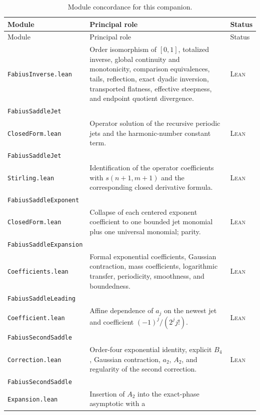 \documentclass[11pt,oneside]{article}
\theoremstyle{definition}
\theoremstyle{remark}
\newcommand{\Formalized}{\textsc{Lean}}
\begin{document}
\begingroup
\small
\begin{longtable}{>{\raggedright\arraybackslash}p{}
                  >{\raggedright\arraybackslash}p{}
                  >{\raggedright\arraybackslash}p{}}
\caption{Module concordance for this companion.}
\label{tab:module-concordance}\\
\toprule
Module & Principal role & Status\\
\midrule
\endfirsthead
\toprule
Module & Principal role & Status\\
\midrule
\endhead
\texttt{FabiusInverse.lean} &
Order isomorphism of $[0,1]$, totalized inverse, global continuity and
monotonicity, comparison equivalences, tails, reflection, exact dyadic
inversion, transported flatness, effective steepness, and endpoint
quotient divergence. & \Formalized\\
\texttt{FabiusSaddleJet}\\\texttt{ClosedForm.lean} &
Operator solution of the recursive periodic jets and the harmonic-number
constant term. & \Formalized\\
\texttt{FabiusSaddleJet}\\\texttt{Stirling.lean} &
Identification of the operator coefficients with
$s(n+1,m+1)$ and the corresponding closed derivative formula. &
\Formalized\\
\texttt{FabiusSaddleExponent}\\\texttt{ClosedForm.lean} &
Collapse of each centered exponent coefficient to one bounded jet
monomial plus one universal monomial; parity. & \Formalized\\
\texttt{FabiusSaddleExpansion}\\\texttt{Coefficients.lean} &
Formal exponential coefficients, Gaussian contraction, mass
coefficients, logarithmic transfer, periodicity, smoothness, and
boundedness. & \Formalized\\
\texttt{FabiusSaddleLeading}\\\texttt{Coefficient.lean} &
Affine dependence of $a_j$ on the newest jet and coefficient
$(-1)^j/(2^jj!)$. & \Formalized\\
\texttt{FabiusSecondSaddle}\\\texttt{Correction.lean} &
Order-four exponential identity, explicit $B_4$, Gaussian contraction,
$a_2$, $A_2$, and regularity of the second correction. & \Formalized\\
\texttt{FabiusSecondSaddle}\\\texttt{Expansion.lean} &
Insertion of $A_2$ into the exact-phase asymptotic with a

\end{longtable}
\end{document}

